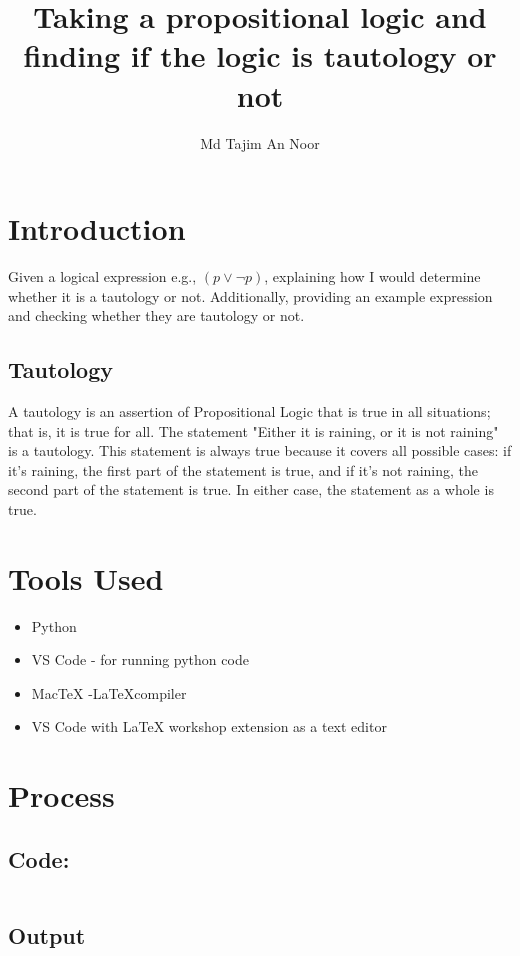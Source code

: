 \documentclass[12pt]{article}
\title{Taking a propositional logic and finding if the logic is tautology or not}
\author{Md Tajim An Noor}
\date{}
\begin{document}

\pagebreak

\maketitle
\section*{Introduction}
Given a logical expression e.g., $ (p \lor \lnot p) $, explaining how I would determine whether it is a tautology or not. Additionally, providing an example expression and checking whether they are tautology or not.

\subsection*{Tautology}
A tautology is an assertion of Propositional Logic that is true in all situations; that is, it is true for all.\cite{16Tauto93}
The statement "Either it is raining, or it is not raining" is a tautology. This statement is always true because it covers all possible cases: if it's raining, the first part of the statement is true, and if it's not raining, the second part of the statement is true. In either case, the statement as a whole is true.

\section*{Tools Used}
\begin{itemize}
    \item Python
    \item VS Code - for running python code
    \item MacTeX -\LaTeX  compiler
    \item VS Code with LaTeX workshop extension as a text editor
\end{itemize}


\section*{Process}

\subsection*{Code:}
\inputminted[breaklines]{python3}{lr2_totology_check.py}

\subsection*{Output}

\end{document}

